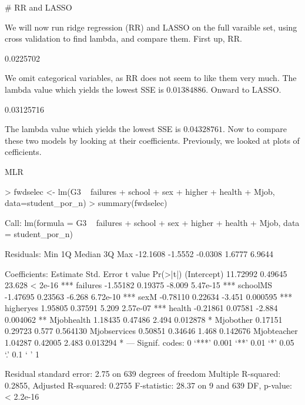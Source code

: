 \documentclass{article}
\begin{document}
# RR and LASSO

We will now run ridge regression (RR) and LASSO on the full varaible set, using cross validation to find lambda, and compare them. First up, RR. 

\begin{Schunk}
\begin{Soutput}
[1] 0.0225702
\end{Soutput}
\end{Schunk}

We omit categorical variables, as RR does not seem to like them very much. The lambda value which yields the lowest SSE is $0.01384886$. Onward to LASSO. 

\begin{Schunk}
\begin{Soutput}
[1] 0.03125716
\end{Soutput}
\end{Schunk}

The lambda value which yields the lowest SSE is $0.04328761$. Now to compare these two models by looking at their coefficients. Previously, we looked at plots of cefficients.

MLR 

\begin{Schunk}
\begin{Sinput}
> fwdselec <- lm(G3 ~ failures + school + sex + higher + health + Mjob, data=student_por_n)
> summary(fwdselec)
\end{Sinput}
\begin{Soutput}
Call:
lm(formula = G3 ~ failures + school + sex + higher + health + 
    Mjob, data = student_por_n)

Residuals:
     Min       1Q   Median       3Q      Max 
-12.1608  -1.5552  -0.0308   1.6777   6.9644 

Coefficients:
             Estimate Std. Error t value Pr(>|t|)    
(Intercept)  11.72992    0.49645  23.628  < 2e-16 ***
failures     -1.55182    0.19375  -8.009 5.47e-15 ***
schoolMS     -1.47695    0.23563  -6.268 6.72e-10 ***
sexM         -0.78110    0.22634  -3.451 0.000595 ***
higheryes     1.95805    0.37591   5.209 2.57e-07 ***
health       -0.21861    0.07581  -2.884 0.004062 ** 
Mjobhealth    1.18435    0.47486   2.494 0.012878 *  
Mjobother     0.17151    0.29723   0.577 0.564130    
Mjobservices  0.50851    0.34646   1.468 0.142676    
Mjobteacher   1.04287    0.42005   2.483 0.013294 *  
---
Signif. codes:  0 ‘***’ 0.001 ‘**’ 0.01 ‘*’ 0.05 ‘.’ 0.1 ‘ ’ 1

Residual standard error: 2.75 on 639 degrees of freedom
Multiple R-squared:  0.2855,	Adjusted R-squared:  0.2755 
F-statistic: 28.37 on 9 and 639 DF,  p-value: < 2.2e-16
\end{Soutput}
\end{Schunk}
\end{document}
